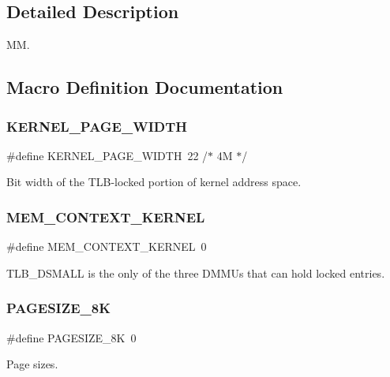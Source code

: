 \subsection{Detailed Description}
MM. 



\subsection{Macro Definition Documentation}
\mbox{\label{group__RTEMSBSPsSPARC64mm_ga92767b7a5f737997e75ce619743ef466}} 
\subsubsection{\texorpdfstring{KERNEL\_PAGE\_WIDTH}{KERNEL\_PAGE\_WIDTH}}
{\footnotesize\ttfamily \#define K\+E\+R\+N\+E\+L\+\_\+\+P\+A\+G\+E\+\_\+\+W\+I\+D\+TH~22	/$\ast$ 4\+M $\ast$/}

Bit width of the T\+L\+B-\/locked portion of kernel address space. \mbox{\label{group__RTEMSBSPsSPARC64mm_ga74b6cf399cbfdfb12e041bd61d1171f1}} 
\subsubsection{\texorpdfstring{MEM\_CONTEXT\_KERNEL}{MEM\_CONTEXT\_KERNEL}}
{\footnotesize\ttfamily \#define M\+E\+M\+\_\+\+C\+O\+N\+T\+E\+X\+T\+\_\+\+K\+E\+R\+N\+EL~0}

T\+L\+B\+\_\+\+D\+S\+M\+A\+LL is the only of the three D\+M\+M\+Us that can hold locked entries. \mbox{\label{group__RTEMSBSPsSPARC64mm_ga5f64c88cc1a61badb5b746244deb0545}} 
\subsubsection{\texorpdfstring{PAGESIZE\_8K}{PAGESIZE\_8K}}
{\footnotesize\ttfamily \#define P\+A\+G\+E\+S\+I\+Z\+E\+\_\+8K~0}

Page sizes. \mbox{\label{group__RTEMSBSPsSPARC64mm_ga8326fafebf0148b0098d808c8d93c1ac}} 
